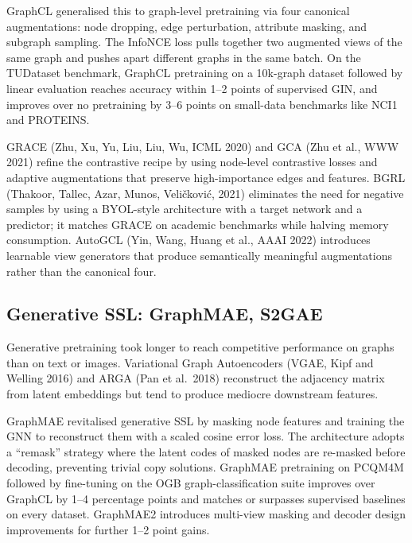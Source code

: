 \documentclass{article}
\begin{document}
GraphCL \citep{you2020graphcontrastivele} generalised this to graph-level pretraining via four canonical augmentations: node dropping, edge perturbation, attribute masking, and subgraph sampling. The InfoNCE loss pulls together two augmented views of the same graph and pushes apart different graphs in the same batch. On the TUDataset benchmark, GraphCL pretraining on a 10k-graph dataset followed by linear evaluation reaches accuracy within 1--2 points of supervised GIN, and improves over no pretraining by 3--6 points on small-data benchmarks like NCI1 and PROTEINS.

GRACE (Zhu, Xu, Yu, Liu, Liu, Wu, ICML 2020) and GCA (Zhu et al., WWW 2021) refine the contrastive recipe by using node-level contrastive losses and adaptive augmentations that preserve high-importance edges and features. BGRL (Thakoor, Tallec, Azar, Munos, Veličković, 2021) eliminates the need for negative samples by using a BYOL-style architecture with a target network and a predictor; it matches GRACE on academic benchmarks while halving memory consumption. AutoGCL (Yin, Wang, Huang et al., AAAI 2022) introduces learnable view generators that produce semantically meaningful augmentations rather than the canonical four.

\subsection{Generative SSL: GraphMAE, S2GAE}\label{generative-ssl-graphmae-s2gae}

Generative pretraining took longer to reach competitive performance on graphs than on text or images. Variational Graph Autoencoders (VGAE, Kipf and Welling 2016) and ARGA (Pan et al.~2018) reconstruct the adjacency matrix from latent embeddings but tend to produce mediocre downstream features.

GraphMAE \citep{hou2022graphmaeselfsuperv} revitalised generative SSL by masking node features and training the GNN to reconstruct them with a scaled cosine error loss. The architecture adopts a ``remask'' strategy where the latent codes of masked nodes are re-masked before decoding, preventing trivial copy solutions. GraphMAE pretraining on PCQM4M followed by fine-tuning on the OGB graph-classification suite improves over GraphCL by 1--4 percentage points and matches or surpasses supervised baselines on every dataset. GraphMAE2 \citep{hou2022graphmaeselfsuperv} introduces multi-view masking and decoder design improvements for further 1--2 point gains.
\end{document}
